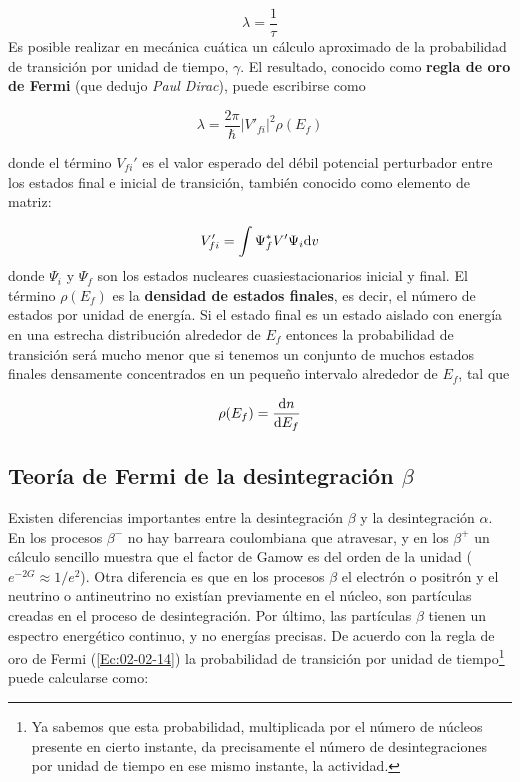 \begin{equation}
	\lambda = \frac{1}{\tau}
\end{equation}
Es posible realizar en mecánica cuática un cálculo aproximado de la probabilidad de transición por unidad de tiempo, $\gamma$. El resultado, conocido como \textbf{regla de oro de Fermi} (que dedujo \textit{Paul Dirac}), puede escribirse como

\begin{mybox}
\begin{equation}
	\lambda = \frac{2\pi}{\hbar} |V'_{fi}|^2 \rho (E_f)	\label{Ec:02-02-14}
\end{equation}
\end{mybox}
donde el término $V_{fi}'$ es el valor esperado del débil potencial perturbador entre los estados final e inicial de transición, también conocido como elemento de matriz:

\begin{equation}
	V_{fi}'= \int \Psi_f^* V' \Psi_i \mathrm{d} v
\end{equation}
donde $\Psi_i$ y $\Psi_f$ son los estados nucleares cuasiestacionarios inicial y final. El término $\rho(E_f)$ es la \textbf{densidad de estados finales}, es decir, el número de estados por unidad de energía. Si el estado final es un estado aislado con energía en una estrecha distribución alrededor de $E_f$ entonces la probabilidad de transición será mucho menor que si tenemos un conjunto de muchos estados finales densamente concentrados en un pequeño intervalo alrededor de $E_f$, tal que

\begin{eqnarray}
	\rho(E_f) = \frac{\mathrm{d} n}{\mathrm{d} E_f}
\end{eqnarray}

\subsection{Teoría de Fermi de la desintegración $\beta$}

Existen diferencias importantes entre la desintegración $\beta$ y la desintegración $\alpha$.  En los procesos $\beta^-$ no hay barreara coulombiana que atravesar, y en los $\beta^+$ un cálculo sencillo muestra que el factor de Gamow es del orden de la unidad ($e^{-2G} \approx 1/e^2$). Otra diferencia es que en los procesos $\beta$ el electrón o positrón y el neutrino o antineutrino no existían previamente en el núcleo, son partículas creadas en el proceso de desintegración. Por último, las partículas $\beta$ tienen un espectro energético continuo, y no energías precisas. De acuerdo con la regla de oro de Fermi (\ref{Ec:02-02-14}) la probabilidad de transición por unidad de tiempo\footnote{Ya sabemos que esta probabilidad, multiplicada por el número de núcleos presente en cierto instante, da precisamente el número de desintegraciones por unidad de tiempo en ese mismo instante, la actividad.} puede calcularse como: 

